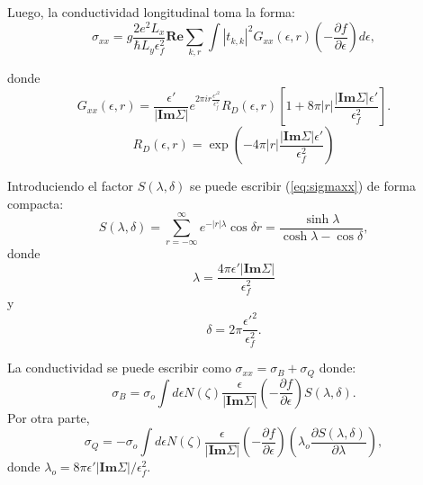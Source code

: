 \begin{frame}
  Luego, la conductividad longitudinal toma la forma:
  \begin{equation}
    \sigma_{xx} = g \frac{2 e^2 L_x}{\hbar L_y \epsilon_{f}^{2}} \textbf{Re} \sum_{k,r}\int\left| t_{k,k}\right|^2 G_{xx}(\epsilon,r) \left(-\frac{\partial f}{\partial\epsilon}\right)d\epsilon,
    \label{eq:sigmaxx}
  \end{equation}

  donde $$
      G_{xx}(\epsilon,r) = \frac{\epsilon'}{|\textbf{Im}\Sigma|} e^{2\pi i r \frac{\epsilon'^2}{\epsilon_{f}^{2}}} R_D(\epsilon,r) \left[ 1+8\pi |r| \frac{|\textbf{Im}\Sigma|\epsilon'}{\epsilon_{f}^{2}}\right].
    $$
  $$ R_D(\epsilon,r) = \exp\left( -4\pi |r|\frac{|\textbf{Im}\Sigma|\epsilon'}{\epsilon_{f}^{2}}\right) $$
\end{frame}

\begin{frame}
  Introduciendo el factor $S(\lambda,\delta)$ se puede escribir (\ref{eq:sigmaxx}) de forma compacta:
  \begin{equation}
    S(\lambda,\delta) = \sum_{r=-\infty}^{\infty} e^{-|r|\lambda}\cos\delta r = \frac{\sinh\lambda}{\cosh\lambda-\cos\delta},
  \end{equation}
  donde
  \begin{equation}
    \lambda= \frac{4\pi\epsilon'|\textbf{Im}\Sigma|}{\epsilon_{f}^{2}}
  \end{equation}
  y
  \begin{equation}
    \delta= 2\pi\frac{\epsilon'^2}{\epsilon_{f}^{2}}.
  \end{equation}
\end{frame}

\begin{frame}
  La conductividad se puede escribir como $\sigma_{xx} = \sigma_B+ \sigma_Q$ donde:
  \begin{equation}
    \sigma_B= \sigma_{o}\int d\epsilon N(\zeta)\frac{\epsilon}{|\textbf{Im}\Sigma|}\left(-\frac{\partial f}{\partial\epsilon}\right)S(\lambda,\delta).
    \label{eq:sigmaB}
  \end{equation}
  Por otra parte,
  \begin{equation}
    \sigma_Q= -\sigma_{o}\int d\epsilon N(\zeta)\frac{\epsilon}{|\textbf{Im}\Sigma|}\left(-\frac{\partial f}{\partial\epsilon}\right) \left(\lambda_o \frac{\partial S(\lambda,\delta)}{\partial \lambda}\right),
    \label{eq:sigmaQ}
  \end{equation}
  donde $\lambda_o=8 \pi\epsilon'|\textbf{Im}\Sigma|/\epsilon_{f}^{2}$.
\end{frame}

